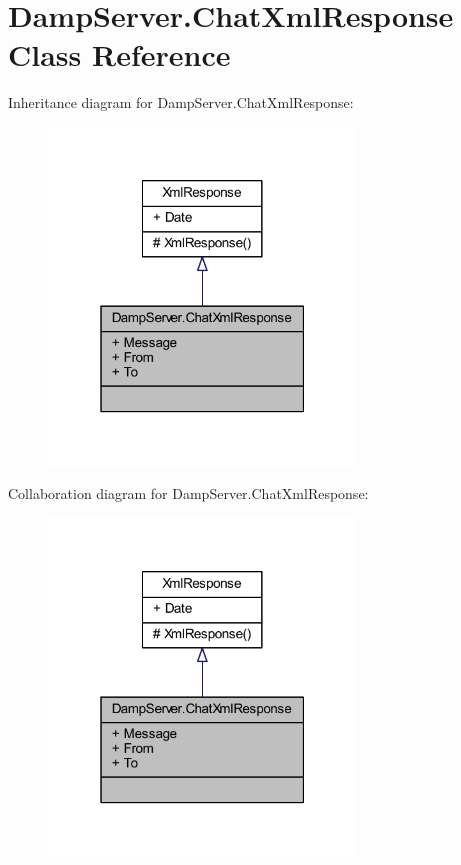 \hypertarget{class_damp_server_1_1_chat_xml_response}{\section{Damp\-Server.\-Chat\-Xml\-Response Class Reference}
\label{class_damp_server_1_1_chat_xml_response}
}


Inheritance diagram for Damp\-Server.\-Chat\-Xml\-Response\-:\nopagebreak
\begin{figure}[H]
\begin{center}
\leavevmode
\includegraphics[width=232pt]{class_damp_server_1_1_chat_xml_response__inherit__graph}
\end{center}
\end{figure}


Collaboration diagram for Damp\-Server.\-Chat\-Xml\-Response\-:\nopagebreak
\begin{figure}[H]
\begin{center}
\leavevmode
\includegraphics[width=232pt]{class_damp_server_1_1_chat_xml_response__coll__graph}
\end{center}
\end{figure}
